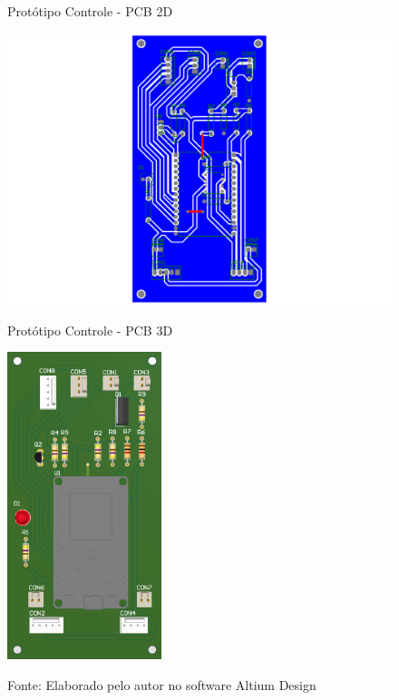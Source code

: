 \documentclass[../poliXuniversity_hospital_-USP-report.tex]{subfiles}
\begin{document}
\begin{figure}[h]
    \centering
    \begin{minipage}{0.5\textwidth}
        \centering
        \caption{Protótipo Controle - PCB 2D}
        \includegraphics[width=1.03\textwidth]{modulos/Controle_Motor-2.png} 
        \label{fig:figura1minipg}
    \end{minipage}\hfill
    \begin{minipage}{0.5\textwidth}
        \centering
        \caption{Protótipo Controle - PCB 3D }
        \includegraphics[width=0.4\textwidth]{modulos/Controle_Motor.png} 
        \label{fig:figura1minipg}
    \end{minipage}\hfill
    
    \caption*{Fonte: Elaborado pelo autor no software Altium Design\cite{altium21} }
    \label{fig:2d3dcontrolepro}
\end{figure}
\end{document}
